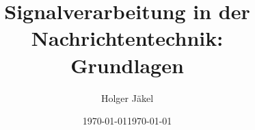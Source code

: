 \documentclass[18pt]{beamer}
\title[Signalverarbeitung in der NT: Grundlagen]{Signalverarbeitung in der Nachrichtentechnik:\\ Grundlagen}
\author[H. J\"akel]{Holger J\"akel}
\date{\americandate\today}
\date{\germandate\today}
\institute{Communications Engineering Lab}
\date{ }
\begin{document}
\begin{frame}
\titlepage
\end{frame}


\end{document}
